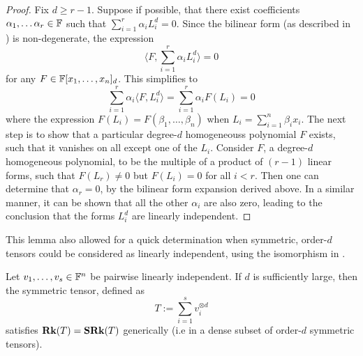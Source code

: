 \documentclass[../Lael_John_MasterThesis_Draft.tex]{subfiles}
\begin{document}
\begin{proof}
	Fix $d \geq r-1$. Suppose if possible, that there exist coefficients $\alpha_1, \ldots \alpha_r \in \mathbb{F}$ such that $\sum_{i=1}^{r} \alpha_iL_i^d = 0$.  Since the bilinear form (as described in ) is non-degenerate, the expression $$ \langle F, \sum_{i=1}^{r} \alpha_iL_i^d \rangle = 0$$for any $F \in \mathbb{F}[x_1, \ldots, x_n]_d$. This simplifies to $$ \sum_{i=1}^{r} \alpha_i\langle F, L_i^d \rangle = \sum_{i=1}^{r} \alpha_i F(L_i) = 0$$where the expression $F(L_i) = F(\beta_1, \ldots, \beta_n)$ when $L_i = \sum_{i=1}^{n} \beta_ix_i$. The next step is to show that a particular degree-$d$ homogeneouss polynomial $F$ exists, such that it vanishes on all except one of the $L_i$. Consider $F$, a degree-$d$ homogeneous polynomial, to be the multiple of a product of $(r-1)$ linear forms, such that $F(L_r) \neq 0$ but $F(L_i) = 0$ for all $i < r$. Then one can determine that $\alpha_r = 0$, by the bilinear form expansion derived above. In a similar manner, it can be shown that all the other $\alpha_i$ are also zero, leading to the conclusion that the forms $L_i^d$ are linearly independent.
\end{proof}
This lemma also allowed for a quick determination when symmetric, order-$d$ tensors could be considered as linearly independent, using the isomorphism in .
\begin{proposition}\label{prop:conjectureholdsorderlargeenough}
	Let $v_1, \ldots, v_s \in \mathbb{F}^n$ be pairwise linearly independent. If $d$ is sufficiently large, then the symmetric tensor, defined as $$T := \sum_{i=1}^{s} v_i^{\otimes d}$$satisfies $\textbf{Rk}(T) = \textbf{SRk}(T)$ generically (i.e in a dense subset of order-$d$ symmetric tensors).
\end{proposition}
\end{document}

